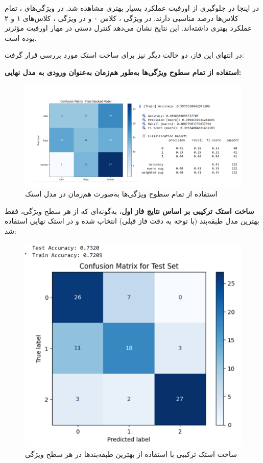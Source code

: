 \documentclass[a4paper,12pt]{article}
\begin{document}
در اینجا در جلوگیری از اورفیت عملکرد بسیار بهتری مشاهده شد. در ویژگی‌های ، تمام کلاس‌ها درصد مناسبی دارند. در ویژگی ، کلاس ۰ و در ویژگی ، کلاس‌های ۱ و ۲ عملکرد بهتری داشته‌اند. این نتایج نشان می‌دهد کنترل دستی در مهار اورفیت مؤثرتر بوده است.

\vspace{0.4cm}
در انتهای این فاز، دو حالت دیگر نیز برای ساخت استک مورد بررسی قرار گرفت:

\textbf{استفاده از تمام سطوح ویژگی‌ها به‌طور هم‌زمان به‌عنوان ورودی به مدل نهایی:}

\begin{figure}[H]
	\centering
	\includegraphics[width=1\textwidth]{all.png}
	\caption*{استفاده از تمام سطوح ویژگی‌ها به‌صورت هم‌زمان در مدل استک}
\end{figure}
\FloatBarrier

\textbf{ساخت استک ترکیبی بر اساس نتایج فاز اول}، به‌گونه‌ای که از هر سطح ویژگی، فقط بهترین مدل طبقه‌بند (با توجه به دقت فاز قبلی) انتخاب شده و در استک نهایی استفاده شد:

\begin{figure}[H]
	\centering
	\includegraphics[width=1\textwidth]{tarkib.png}
	\caption*{ساخت استک ترکیبی با استفاده از بهترین طبقه‌بندها در هر سطح ویژگی}
\end{figure}
\FloatBarrier
\end{document}
